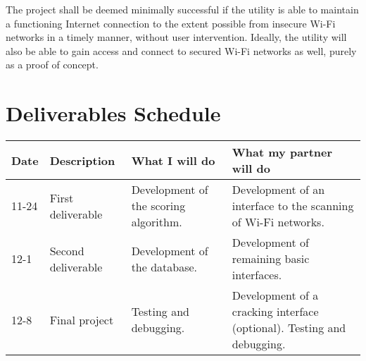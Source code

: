 \documentclass{article}
\begin{document}
The project shall be deemed minimally successful if the utility is able to
maintain a functioning Internet connection to the extent possible from insecure
Wi-Fi networks in a timely manner, without user intervention. Ideally, the
utility will also be able to gain access and connect to secured Wi-Fi networks
as well, purely as a proof of concept.

\section{Deliverables Schedule}
\begin{tabular}[t]{|l|p{.15\linewidth}|p{.3\linewidth}|p{.3\linewidth}|}
  \hline
  Date & Description & What I will do & What my partner will do\\\hline
  11-24 & First deliverable & Development of the scoring algorithm. &
  Development of an interface to the scanning of Wi-Fi networks.\\\hline
  12-1 & Second deliverable & Development of the database. & Development of
  remaining basic interfaces.\\\hline
  12-8 & Final project & Testing and debugging. & Development of a cracking
  interface (optional). Testing and debugging.\\\hline
\end{tabular}
\end{document}
